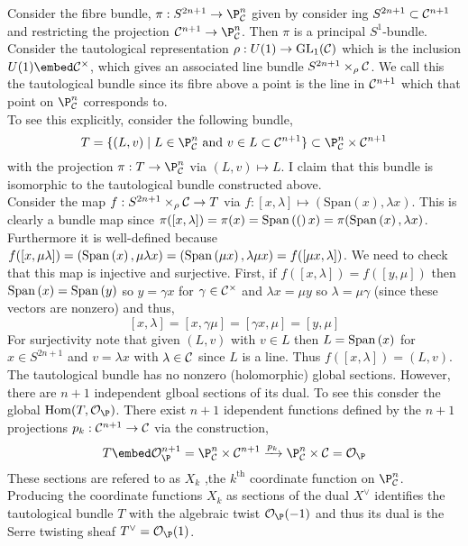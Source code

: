 \documentclass[12pt]{article}
\begin{document}
Consider the fibre bundle, $\pi : S^{2 n + 1} \to \P^n_{\C}$ given by consider ing $S^{2n +1} \subset \mathcal{C}^{n+1}$ and restricting the projection $\C^{n+1} \to \P^n_\C$. Then $\pi$ is a principal $S^1$-bundle. Consider the tautological representation $\rho : U(1) \to \mathrm{GL}_1(\mathcal{C})$ which is the inclusion $U(1) \embed \C^\times$, which gives an associated line bundle $S^{2 n + 1} \times_\rho \mathcal{C}$. We call this the tautological bundle since its fibre above a point is the line in $\mathcal{C}^{n+1}$ which that point on $\P^n_\C$ corresponds to.
\bigskip\\
To see this explicitly, consider the following bundle,
\[ T = \{ (L, v) \mid L \in \P^n_\C \textrm{ and } v \in L \subset \C^{n+1} \} \subset \P^n_\C \times \C^{n+1} \]
with the projection $\pi : T \to \P^n_\C$ via $(L, v) \mapsto L$. I claim that this bundle is isomorphic to the tautological bundle constructed above. 
\bigskip\\
Consider the map $f : S^{2n + 1} \times_\rho \mathcal{C} \to T$ via $f : [x, \lambda] \mapsto ( \mathrm{Span}(x), \lambda x)$. This is clearly a bundle map since $\pi([x, \lambda]) = \pi(x) = \mathrm{Span}\left( ( \right)x) = \pi(\mathrm{Span}\left( x \right), \lambda x)$. Furthermore it is well-defined because $f([x, \mu \lambda]) = (\mathrm{Span}\left( x \right), \mu \lambda x) = (\mathrm{Span}\left( \mu x \right), \lambda \mu x) = f([\mu x, \lambda])$. We need to check that this map is injective and surjective. First, if $f([x, \lambda]) = f([y, \mu])$ then $\mathrm{Span}\left( x \right) = \mathrm{Span}\left( y \right)$ so $y = \gamma x$ for $\gamma \in \mathcal{C}^\times$ and $\lambda x = \mu y$ so $\lambda = \mu \gamma$ (since these vectors are nonzero) and thus,
\[ [x, \lambda] = [x, \gamma \mu] = [\gamma x, \mu] = [y, \mu] \]
For surjectivity note that given $(L, v)$ with $v \in L$ then $L = \mathrm{Span}\left( x \right)$ for $x \in S^{2n + 1}$ and $v = \lambda x$ with $\lambda \in \mathcal{C}$ since $L$ is a line. Thus $f([x, \lambda]) = (L, v)$. 
\bigskip\\
The tautological bundle has no nonzero (holomorphic) global sections.   However, there are $n+1$ independent glboal sections of its dual. To see this consder the global $\mathrm{Hom}(T, \mathcal{O}_\P)$. There exist $n+1$ idependent functions defined by the $n+1$ projections $p_k : \mathcal{C}^{n+1} \to \mathcal{C}$ via the construction, 
\[ T \embed \mathcal{O}^{n+1}_\P = \P^n_\C \times \C^{n+1} \xrightarrow{p_k} \P^n_\C \times \C = \mathcal{O}_\P \]
These sections are refered to as $X_k$ ,the $k^{\mathrm{th}}$ coordinate function on $\P^n_\C$.
\bigskip\\
Producing the coordinate functions $X_k$ as sections of the dual $X^\vee$ identifies the tautological bundle $T$ with the algebraic twist $\mathcal{O}_\P(-1)$ and thus its dual is the Serre twisting sheaf $T^\vee = \mathcal{O}_\P(1)$. 
\end{document}
